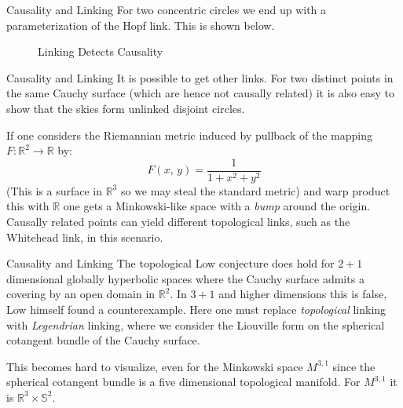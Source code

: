 \documentclass{beamer}
\begin{document}
    \begin{frame}{Causality and Linking}
        For two concentric circles we end up with a parameterization of the
        Hopf link. This is shown below.
        \begin{figure}
            \centering
            \caption{Linking Detects Causality}
            \label{fig:linking_detects_causality_001}
        \end{figure}
    \end{frame}
    \begin{frame}{Causality and Linking}
        It is possible to get other links. For two distinct points in the same
        Cauchy surface (which are hence not causally related) it is also easy
        to show that the skies form unlinked disjoint circles.
        \par\hfill\par
        If one considers the Riemannian metric induced by pullback of the
        mapping $F:\mathbb{R}^{2}\rightarrow\mathbb{R}$ by:
        \begin{equation}
            F(x,\,y)=\frac{1}{1+x^{2}+y^{2}}
        \end{equation}
        (This is a surface in $\mathbb{R}^{3}$ so we may steal the standard
        metric) and warp product this with $\mathbb{R}$ one gets a
        Minkowski-like space with a \textit{bump} around the origin.
        Causally related points can yield different topological links, such as
        the Whitehead link, in this scenario.
    \end{frame}
    \begin{frame}{Causality and Linking}
        The topological Low conjecture does hold for $2+1$ dimensional globally
        hyperbolic spaces where the Cauchy surface admits a covering by an open
        domain in $\mathbb{R}^{2}$. In $3+1$ and higher dimensions this is
        false, Low himself found a counterexample. Here one must
        replace \textit{topological} linking with \textit{Legendrian} linking,
        where we consider the Liouville form on the spherical cotangent bundle
        of the Cauchy surface.
        \par\hfill\par
        This becomes hard to visualize, even for the Minkowski space $M^{3,1}$
        since the spherical cotangent bundle is a five dimensional topological
        manifold. For $M^{3,1}$ it is $\mathbb{R}^{3}\times\mathbb{S}^{2}$.
    \end{frame}
\end{document}
